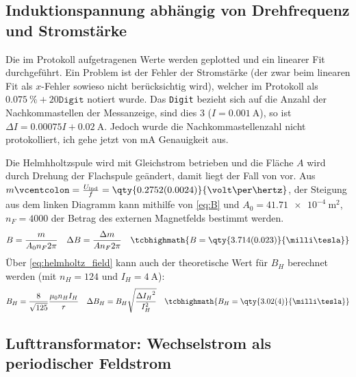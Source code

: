 \renewcommand{\thesubsection}{\thesection.\Roman{subsection}}

\subsection{Induktionspannung abhängig von Drehfrequenz und Stromstärke}
Die im Protokoll aufgetragenen Werte werden geplotted und ein linearer Fit durchgeführt. Ein Problem ist der Fehler der Stromstärke (der zwar beim linearen Fit als \(x\)-Fehler sowieso nicht berücksichtig wird), welcher im Protokoll als \(\qty{0.075}{\percent}+20\texttt{Digit}\) notiert wurde. Das \texttt{Digit} bezieht sich auf die Anzahl der Nachkommastellen der Messanzeige, sind dies 3 (\(I=\qty{0.001}{\ampere}\)), so ist \(\Delta I=0.00075I+\qty{0.02}{\ampere}\). Jedoch wurde die Nachkommastellenzahl nicht protokolliert, ich gehe jetzt von \(\unit{\milli\ampere}\) Genauigkeit aus.


Die Helmhholtzspule wird mit Gleichstrom betrieben und die Fläche \(A\) wird durch Drehung der Flachspule geändert, damit liegt der Fall von  vor.  
Aus \(m\defeq\frac{U_\text{ind}}{f}=\qty{0.2752(0.0024)}{\volt\per\hertz}\), der Steigung aus dem linken Diagramm kann mithilfe von \cref{eq:B} und \(A_0=\qty{41.71e-4}{\m\squared}\), \(n_F=4000\) der Betrag des externen Magnetfelds bestimmt werden. 
\begin{align}
    B=\frac{m}{A_0n_F2\pi}&&\Delta B=\frac{\Delta {m}}{A n_F 2 \pi}&&\tcbhighmath{B=\qty{3.714(0.023)}{\milli\tesla}}
\end{align}
Über \cref{eq:helmholtz_field} kann auch der theoretische Wert für \(B_H\) berechnet werden (mit \(n_H=124\) und \(I_H=\qty{4}{\ampere}\)):
\begin{align}
        B_H = \frac{8}{\sqrt{125}}\frac{\mu_0n_HI_H}{r}&&\Delta B_H=B_H\sqrt{\frac{\Delta{I_H}^{2}}{I_H^{2}}}&&\tcbhighmath{B_H=\qty{3.02(4)}{\milli\tesla}}
\end{align}

\subsection{Lufttransformator: Wechselstrom als periodischer Feldstrom}
